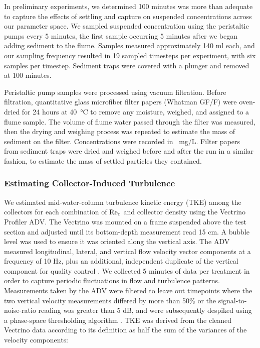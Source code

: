 \documentclass[geosciences,article,submit,moreauthors,pdftex]{Definitions/mdpi}
\begin{document}
In preliminary experiments, we determined 100 minutes was more than adequate to capture the effects of settling and capture on suspended concentrations across our parameter space. We sampled suspended concentration using the peristaltic pumps every 5 minutes, the first sample occurring 5 minutes after we began adding sediment to the flume. Samples measured approximately 140 ml each, and our sampling frequency resulted in 19 sampled timesteps per experiment, with six samples per timestep. Sediment traps were covered with a plunger and removed at 100 minutes.

Peristaltic pump samples were processed using vacuum filtration. Before filtration, quantitative glass microfiber filter papers (Whatman GF/F) were oven-dried for 24 hours at \SI{40}{\celsius} to remove any moisture, weighed, and assigned to a flume sample. The volume of flume water passed through the filter was measured, then the drying and weighing process was repeated to estimate the mass of sediment on the filter. Concentrations were recorded in \SI{}{\milli\gram/\liter}. Filter papers from sediment traps were dried and weighed before and after the run in a similar fashion, to estimate the mass of settled particles they contained.

\subsubsection{Estimating Collector-Induced Turbulence}

We estimated mid-water-column turbulence kinetic energy (TKE) among the collectors for each combination of $\mathrm{Re}_c$ and collector density using the Vectrino Profiler ADV. The Vectrino was mounted on a frame suspended above the test section and adjusted until its bottom-depth measurement read 15 cm. A bubble level was used to ensure it was oriented along the vertical axis. The ADV measured longitudinal, lateral, and vertical flow velocity vector components at a frequency of 10 Hz, plus an additional, independent duplicate of the vertical component for quality control \cite{nortek2018}. We collected 5 minutes of data per treatment in order to capture periodic fluctuations in flow and turbulence patterns. Measurements taken by the ADV were filtered to leave out timepoints where the two vertical velocity measurements differed by more than 50\% or the signal-to-noise-ratio reading was greater than 5 dB, and were subsequently despiked using a phase-space thresholding algorithm \cite{goring_nikora}. TKE was derived from the cleaned Vectrino data according to its definition as half the sum of the variances of the velocity components:
\end{document}
